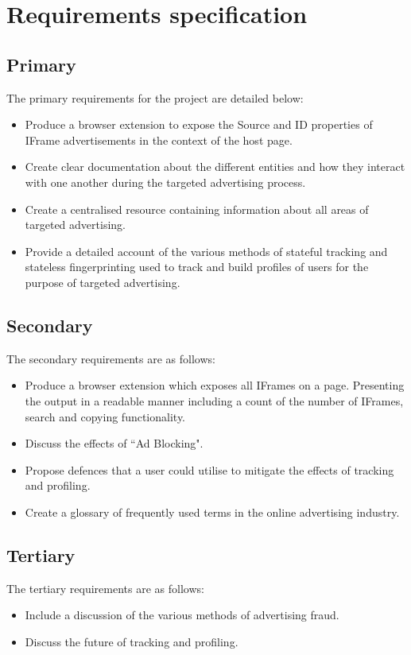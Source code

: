 \documentclass[12pt]{article}
\begin{document}
\pagebreak

\section{Requirements specification} \label{requirements}

\subsection{Primary}
The primary requirements for the project are detailed below:
\begin{itemize}
    \item Produce a browser extension to expose the Source and ID properties of IFrame advertisements in the context of the host page.
    \item Create clear documentation about the different entities and how they interact with one another during the targeted advertising process.
    \item Create a centralised resource containing information about all areas of targeted advertising.
    \item Provide a detailed account of the various methods of stateful tracking and stateless fingerprinting used to track and build profiles of users for the purpose of targeted advertising.
\end{itemize}

\subsection{Secondary}
The secondary requirements are as follows:
\begin{itemize}
    \item Produce a browser extension which exposes all IFrames on a page. Presenting the output in a readable manner including a count of the number of IFrames, search and copying functionality. 
    \item Discuss the effects of ``Ad Blocking". 
    \item Propose defences that a user could utilise to mitigate the effects of tracking and profiling.
    \item Create a glossary of frequently used terms in the online advertising industry.
\end{itemize}

\subsection{Tertiary}
The tertiary requirements are as follows:
\begin{itemize}
    \item Include a discussion of the various methods of advertising fraud.
    \item Discuss the future of tracking and profiling.
\end{itemize}
\end{document}

